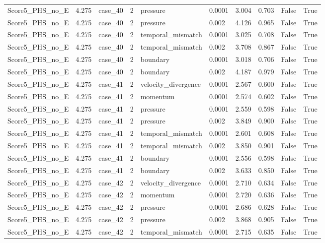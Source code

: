 \begin{longtable}{llllllllll}
Score5\_PHS\_no\_E & 4.275 & case\_40 & 2 & pressure & 0.0001 & 3.004 & 0.703 & False & True \\
Score5\_PHS\_no\_E & 4.275 & case\_40 & 2 & pressure & 0.002 & 4.126 & 0.965 & False & True \\
Score5\_PHS\_no\_E & 4.275 & case\_40 & 2 & temporal\_mismatch & 0.0001 & 3.025 & 0.708 & False & True \\
Score5\_PHS\_no\_E & 4.275 & case\_40 & 2 & temporal\_mismatch & 0.002 & 3.708 & 0.867 & False & True \\
Score5\_PHS\_no\_E & 4.275 & case\_40 & 2 & boundary & 0.0001 & 3.018 & 0.706 & False & True \\
Score5\_PHS\_no\_E & 4.275 & case\_40 & 2 & boundary & 0.002 & 4.187 & 0.979 & False & True \\
Score5\_PHS\_no\_E & 4.275 & case\_41 & 2 & velocity\_divergence & 0.0001 & 2.567 & 0.600 & False & True \\
Score5\_PHS\_no\_E & 4.275 & case\_41 & 2 & momentum & 0.0001 & 2.574 & 0.602 & False & True \\
Score5\_PHS\_no\_E & 4.275 & case\_41 & 2 & pressure & 0.0001 & 2.559 & 0.598 & False & True \\
Score5\_PHS\_no\_E & 4.275 & case\_41 & 2 & pressure & 0.002 & 3.849 & 0.900 & False & True \\
Score5\_PHS\_no\_E & 4.275 & case\_41 & 2 & temporal\_mismatch & 0.0001 & 2.601 & 0.608 & False & True \\
Score5\_PHS\_no\_E & 4.275 & case\_41 & 2 & temporal\_mismatch & 0.002 & 3.850 & 0.901 & False & True \\
Score5\_PHS\_no\_E & 4.275 & case\_41 & 2 & boundary & 0.0001 & 2.556 & 0.598 & False & True \\
Score5\_PHS\_no\_E & 4.275 & case\_41 & 2 & boundary & 0.002 & 3.633 & 0.850 & False & True \\
Score5\_PHS\_no\_E & 4.275 & case\_42 & 2 & velocity\_divergence & 0.0001 & 2.710 & 0.634 & False & True \\
Score5\_PHS\_no\_E & 4.275 & case\_42 & 2 & momentum & 0.0001 & 2.720 & 0.636 & False & True \\
Score5\_PHS\_no\_E & 4.275 & case\_42 & 2 & pressure & 0.0001 & 2.686 & 0.628 & False & True \\
Score5\_PHS\_no\_E & 4.275 & case\_42 & 2 & pressure & 0.002 & 3.868 & 0.905 & False & True \\
Score5\_PHS\_no\_E & 4.275 & case\_42 & 2 & temporal\_mismatch & 0.0001 & 2.715 & 0.635 & False & True \\

\end{longtable}
